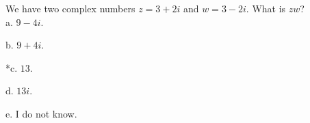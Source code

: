 
We have two complex numbers \(z = 3 + 2i\) and \(w = 3 - 2i\). What is \(zw\)?\\

a. \(9 - 4i\).

b. \(9 + 4i\).

*c. \(13\).

d. \(13i\).

e. I do not know.\\
